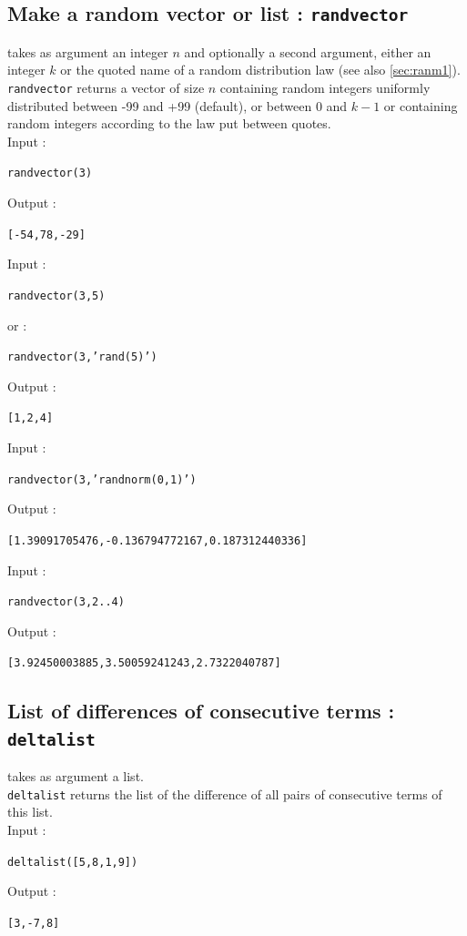 \documentclass[a4paper,11pt]{book}
\begin{document}
\subsection{Make a random vector or list  : {\tt randvector}}
\label{sec:ranm4}
 takes as argument an integer $n$ and optionally a 
second argument, either an integer $k$ or the quoted name of
a random distribution law
(see also \ref{sec:ranm1}).\\ %
{\tt randvector} returns a vector of size $n$ containing random integers 
uniformly distributed between -99 and +99 (default), or between 0 and $k-1$
or containing random 
integers according to the law put between quotes.\\
Input :
\begin{center}{\tt randvector(3)}\end{center}
Output :
\begin{center}{\tt [-54,78,-29]}\end{center}
Input :
\begin{center}{\tt randvector(3,5)}\end{center}
or :
\begin{center}{\tt randvector(3,'rand(5)')}\end{center}
Output :
\begin{center}{\tt [1,2,4]}\end{center}
Input :
\begin{center}{\tt randvector(3,'randnorm(0,1)')}\end{center}
Output :
\begin{center}{\tt [1.39091705476,-0.136794772167,0.187312440336]}\end{center}
Input :
\begin{center}{\tt randvector(3,2..4)}\end{center}
Output :
\begin{center}{\tt [3.92450003885,3.50059241243,2.7322040787]}\end{center}

\subsection{List of differences of consecutive terms  : {\tt deltalist}}
 takes as argument a list.\\
{\tt deltalist} returns the list of the difference of all 
pairs of consecutive terms of this list.\\
Input :
\begin{center}{\tt deltalist([5,8,1,9])}\end{center}
Output :
\begin{center}{\tt [3,-7,8]}\end{center}
\end{document}
